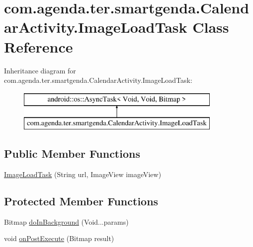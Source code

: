 \hypertarget{classcom_1_1agenda_1_1ter_1_1smartgenda_1_1_calendar_activity_1_1_image_load_task}{\section{com.\-agenda.\-ter.\-smartgenda.\-Calendar\-Activity.\-Image\-Load\-Task Class Reference}
\label{classcom_1_1agenda_1_1ter_1_1smartgenda_1_1_calendar_activity_1_1_image_load_task}
}
Inheritance diagram for com.\-agenda.\-ter.\-smartgenda.\-Calendar\-Activity.\-Image\-Load\-Task\-:\begin{figure}[H]
\begin{center}
\leavevmode
\includegraphics[height=2.000000cm]{classcom_1_1agenda_1_1ter_1_1smartgenda_1_1_calendar_activity_1_1_image_load_task}
\end{center}
\end{figure}
\subsection*{Public Member Functions}
\begin{DoxyCompactItemize}
\item 
\hyperlink{classcom_1_1agenda_1_1ter_1_1smartgenda_1_1_calendar_activity_1_1_image_load_task_a15cf07a0ebb28326ba583435eb44ddd5}{Image\-Load\-Task} (String url, Image\-View image\-View)
\end{DoxyCompactItemize}
\subsection*{Protected Member Functions}
\begin{DoxyCompactItemize}
\item 
Bitmap \hyperlink{classcom_1_1agenda_1_1ter_1_1smartgenda_1_1_calendar_activity_1_1_image_load_task_af91bae6c2ca6e63276c44612f432dcf1}{do\-In\-Background} (Void...\-params)
\item 
void \hyperlink{classcom_1_1agenda_1_1ter_1_1smartgenda_1_1_calendar_activity_1_1_image_load_task_a8c66da143543eaa1745f722d84eaf8e3}{on\-Post\-Execute} (Bitmap result)
\end{DoxyCompactItemize}


